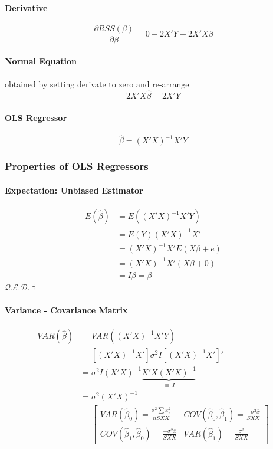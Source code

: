 \documentclass[11pt]{article}
\newcommand{\qed}{\hfill $\mathcal{Q}.\mathcal{E}.\mathcal{D}.\dagger$}
\begin{document}
\paragraph{Derivative}
\begin{equation*}
    \frac{\partial RSS(\beta)}{\partial \beta} = 0 - 2X'Y + 2X'X\beta
\end{equation*}
\paragraph{Normal Equation} obtained by setting derivate to zero and re-arrange
\begin{equation*}
    2X'X\hat{\beta} = 2X'Y
\end{equation*}
\paragraph{OLS Regressor}
\begin{equation*}
    \hat{\beta} = (X'X)^{-1}X'Y
\end{equation*}

\subsubsection{Properties of OLS Regressors}
\paragraph{Expectation: Unbiased Estimator}
\begin{align*}
    E(\hat{\beta}) &= E((X'X)^{-1}X'Y) \\
    &= E(Y)(X'X)^{-1}X' \\
    &= (X'X)^{-1}X' E(X\beta + e) \\
    &= (X'X)^{-1}X' (X\beta + 0) \\
    &= I\beta = \beta
\end{align*}
\qed
\paragraph{Variance - Covariance Matrix}
\begin{align*}
    VAR(\hat{\beta}) &= VAR( (X'X)^{-1}X'Y ) \\
    &= [(X'X)^{-1}X'] \sigma^2 I [(X'X)^{-1}X']' \\
    &= \sigma^2 I (X'X)^{-1}  \underbrace{X'X (X'X)^{-1}}_{\equiv~I} \\
    &= \sigma^2 (X'X)^{-1} \\
    &=
    \begin{bmatrix}
        VAR(\hat{\beta}_0) =  \frac{\sigma^2\sum x_{i}^{2}}{n S X X}
        & COV(\hat{\beta}_0, \hat{\beta}_1) = \frac{-\sigma^2\bar{x}}{S X X} \\
        COV(\hat{\beta}_1, \hat{\beta}_0) = \frac{-\sigma^2\bar{x}}{S X X}
        & VAR(\hat{\beta}_1) = \frac{\sigma^2}{SXX}
    \end{bmatrix}
\end{align*}
\end{document}
